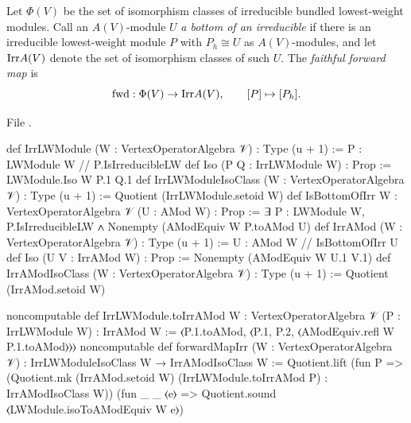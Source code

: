 \begin{definition}\label{l13:def:irrclasses}
Let $\Phi(V)$ be the set of isomorphism classes of irreducible bundled lowest-weight modules. Call an $A(V)$-module $U$
\emph{a bottom of an irreducible} if there is an irreducible lowest-weight module $P$ with $P_h\cong U$ as
$A(V)$-modules, and let $\mathrm{Irr} A(V)$ denote the set of isomorphism classes of such $U$. The \emph{faithful forward
map} is
\begin{equation*}
 \mathrm{fwd}:\Phi(V)\to\mathrm{Irr} A(V),\qquad [P]\mapsto[P_h].
\end{equation*}
\end{definition}
\noindent File .
\begin{leancode}
def IrrLWModule (W : VertexOperatorAlgebra 𝒱) : Type (u + 1) :=
  {P : LWModule W // P.IsIrreducibleLW}
def Iso (P Q : IrrLWModule W) : Prop := LWModule.Iso W P.1 Q.1
def IrrLWModuleIsoClass (W : VertexOperatorAlgebra 𝒱) : Type (u + 1) :=
  Quotient (IrrLWModule.setoid W)
def IsBottomOfIrr {W : VertexOperatorAlgebra 𝒱} (U : AMod W) : Prop :=
  ∃ P : LWModule W, P.IsIrreducibleLW ∧ Nonempty (AModEquiv W P.toAMod U)
def IrrAMod (W : VertexOperatorAlgebra 𝒱) : Type (u + 1) :=
  {U : AMod W // IsBottomOfIrr U}
def Iso (U V : IrrAMod W) : Prop := Nonempty (AModEquiv W U.1 V.1)
def IrrAModIsoClass (W : VertexOperatorAlgebra 𝒱) : Type (u + 1) :=
  Quotient (IrrAMod.setoid W)

noncomputable def IrrLWModule.toIrrAMod {W : VertexOperatorAlgebra 𝒱} (P : IrrLWModule W) :
    IrrAMod W :=
  ⟨P.1.toAMod, ⟨P.1, P.2, ⟨AModEquiv.refl W P.1.toAMod⟩⟩⟩
noncomputable def forwardMapIrr (W : VertexOperatorAlgebra 𝒱) :
    IrrLWModuleIsoClass W → IrrAModIsoClass W :=
  Quotient.lift
    (fun P => (Quotient.mk (IrrAMod.setoid W) (IrrLWModule.toIrrAMod P) : IrrAModIsoClass W))
    (fun _ _ ⟨e⟩ => Quotient.sound ⟨LWModule.isoToAModEquiv W e⟩)
\end{leancode}

